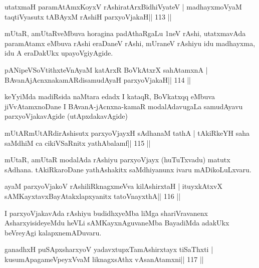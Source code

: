 \begin{shl}
utatxmaH paramAtAmxKoyxV rAshiratArxBidhiVyateV |
madhayxmoV\s yaM taqtiVyasutx tABAyxM rAshiH parxyoVjakaH\hfill || 113 ||
\end{shl}

\begin{artha}
mUtaR, amUtaRveMbuva horagina padAthaRgaLu 1neV rAshi, utatxmavAda paramAtamx eMbuva rAshi eraDaneV rAshi, mUraneV rAshiyu idu madhayxma, idu A eraDakUkx upayoVgiyAgide.
\end{artha}


\begin{shl}
pANipeVSoVtithxteVnAyaM katArxR BoVkAtxrX sahA\s\s tamxnA |
BAvanAjAcnxnakamARdisamudAyaH parxyoVjakaH\hfill || 114 ||
\end{shl}

\begin{artha}
keYyiMda madiRsida naMtara edadx I kataqR, BoVkatxqq eMbuva
jiVvAtamxnoDane I BAvanA-jAcnxna-kamaR modalAdavugaLa samudAyavu
parxyoVjakavAgide (utApxdakavAgide)
\end{artha}

\begin{shl}
mUtARmUtARdirAshisutx parxyoVjayxH sAdhanaM tathA |
tAkiRkeYH saha saMdhiM ca cikiVSaRnitx yathAbalamf\hfill || 115 ||
\end{shl}

\begin{artha}
mUtaR, amUtaR modalAda rAshiyu parxyoVjayx (huTuTxvadu) matutx sAdhana.
tAkiRkaroDane yathAshakitx saMdhiyanunx ivaru mADikoLuLxvaru. 
\end{artha}

\begin{shl}
ayaM parxyoVjakoV rAshiliRknagxmeVva kilA\s\s shirxtaH |
ituyxkAtxvX sAMKayxtavxBayAtakxlapxyanitx tatoV\s nayxthA\hfill || 116 ||
\end{shl}

\begin{artha}
I parxyoVjakavAda rAshiyu budidhxyeMba liMga shariVravanenx
AsharxyisideyeMdu heVLi sAMKayxnAguvaneMba BayadiMda adakUkx beVreyAgi
kalapxne\break mADuvaru.
\end{artha}



\begin{shl}
ganadhxH puSApxsharxyoV yadavxtupxTamAshirxtayx tiSaThxti |
kusumApagameV\s peyxVvaM liknagxsAthx vAsanA\s\s tamxni\hfill || 117 ||
\end{shl}

